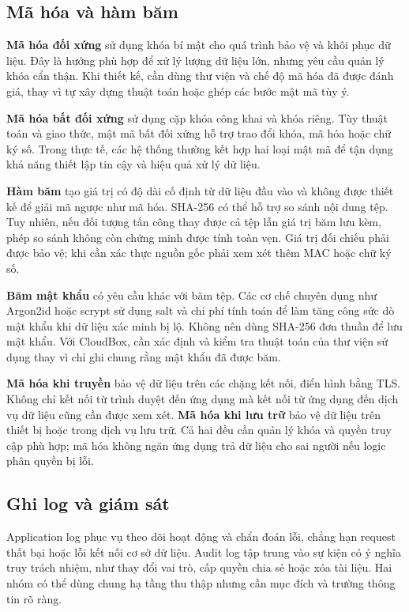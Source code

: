 \subsection{Mã hóa và hàm băm}
\textbf{Mã hóa đối xứng} sử dụng khóa bí mật cho quá trình bảo vệ và khôi phục dữ liệu. Đây là hướng phù hợp để xử lý lượng dữ liệu lớn, nhưng yêu cầu quản lý khóa cẩn thận. Khi thiết kế, cần dùng thư viện và chế độ mã hóa đã được đánh giá, thay vì tự xây dựng thuật toán hoặc ghép các bước mật mã tùy ý.

\textbf{Mã hóa bất đối xứng} sử dụng cặp khóa công khai và khóa riêng. Tùy thuật toán và giao thức, mật mã bất đối xứng hỗ trợ trao đổi khóa, mã hóa hoặc chữ ký số. Trong thực tế, các hệ thống thường kết hợp hai loại mật mã để tận dụng khả năng thiết lập tin cậy và hiệu quả xử lý dữ liệu.

\textbf{Hàm băm} tạo giá trị có độ dài cố định từ dữ liệu đầu vào và không được thiết kế để giải mã ngược như mã hóa. SHA-256 có thể hỗ trợ so sánh nội dung tệp. Tuy nhiên, nếu đối tượng tấn công thay được cả tệp lẫn giá trị băm lưu kèm, phép so sánh không còn chứng minh được tính toàn vẹn. Giá trị đối chiếu phải được bảo vệ; khi cần xác thực nguồn gốc phải xem xét thêm MAC hoặc chữ ký số.

\textbf{Băm mật khẩu} có yêu cầu khác với băm tệp. Các cơ chế chuyên dụng như Argon2id hoặc scrypt sử dụng salt và chi phí tính toán để làm tăng công sức dò mật khẩu khi dữ liệu xác minh bị lộ. Không nên dùng SHA-256 đơn thuần để lưu mật khẩu. Với CloudBox, cần xác định và kiểm tra thuật toán của thư viện sử dụng thay vì chỉ ghi chung rằng mật khẩu đã được băm.\cite{password}

\textbf{Mã hóa khi truyền} bảo vệ dữ liệu trên các chặng kết nối, điển hình bằng TLS. Không chỉ kết nối từ trình duyệt đến ứng dụng mà kết nối từ ứng dụng đến dịch vụ dữ liệu cũng cần được xem xét. \textbf{Mã hóa khi lưu trữ} bảo vệ dữ liệu trên thiết bị hoặc trong dịch vụ lưu trữ. Cả hai đều cần quản lý khóa và quyền truy cập phù hợp; mã hóa không ngăn ứng dụng trả dữ liệu cho sai người nếu logic phân quyền bị lỗi.

\subsection{Ghi log và giám sát}
Application log phục vụ theo dõi hoạt động và chẩn đoán lỗi, chẳng hạn request thất bại hoặc lỗi kết nối cơ sở dữ liệu. Audit log tập trung vào sự kiện có ý nghĩa truy trách nhiệm, như thay đổi vai trò, cấp quyền chia sẻ hoặc xóa tài liệu. Hai nhóm có thể dùng chung hạ tầng thu thập nhưng cần mục đích và trường thông tin rõ ràng.

